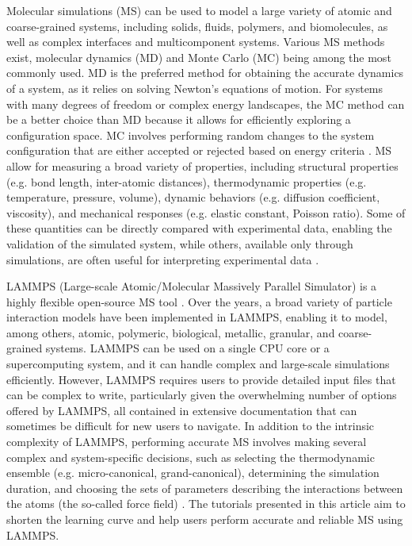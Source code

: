 \documentclass[9pt,tutorial]{livecoms}
\begin{document}

Molecular simulations (MS) can be used to model a large variety of atomic and coarse-grained systems, including solids, fluids, polymers, and biomolecules, as well as complex interfaces and multicomponent systems. Various MS methods exist, molecular dynamics (MD) and Monte Carlo (MC) being among the most commonly used. MD is the preferred method for obtaining the accurate dynamics of a system, as it relies on solving Newton's equations of motion. For systems with many degrees of freedom or complex energy landscapes, the MC method can be a better choice than MD because it allows for efficiently exploring a configuration space. MC involves performing random changes to the system configuration that are either accepted or rejected based on energy criteria \cite{frenkel2023understanding, allen2017computer}. MS allow for measuring a broad variety of properties, including structural properties (e.g. bond length, inter-atomic distances), thermodynamic properties (e.g. temperature, pressure, volume), dynamic behaviors (e.g. diffusion coefficient, viscosity), and mechanical responses (e.g. elastic constant, Poisson ratio). Some of these quantities can be directly compared with experimental data, enabling the validation of the simulated system, while others, available only through simulations, are often useful for interpreting experimental data  \cite{van2008molecular}. 

LAMMPS (Large-scale Atomic/Molecular Massively Parallel Simulator) is a highly flexible open-source MS tool \cite{thompson2022lammps}. Over the years, a broad variety of particle interaction models have been implemented in LAMMPS, enabling it to model, among others, atomic, polymeric, biological, metallic, granular, and coarse-grained systems. LAMMPS can be used on a single CPU core or a supercomputing system, and it can handle complex and large-scale simulations efficiently. However, LAMMPS requires users to provide detailed input files that can be complex to write, particularly given the overwhelming number of options offered by LAMMPS, all contained in extensive documentation that can sometimes be difficult for new users to navigate. In addition to the intrinsic complexity of LAMMPS, performing accurate MS involves making several complex and system-specific decisions, such as selecting the thermodynamic ensemble (e.g. micro-canonical, grand-canonical), determining the simulation duration, and choosing the sets of parameters describing the interactions between the atoms (the so-called force field) \cite{van2018validation}. The tutorials presented in this article aim to shorten the learning curve and help users perform accurate and reliable MS using LAMMPS.
\end{document}
